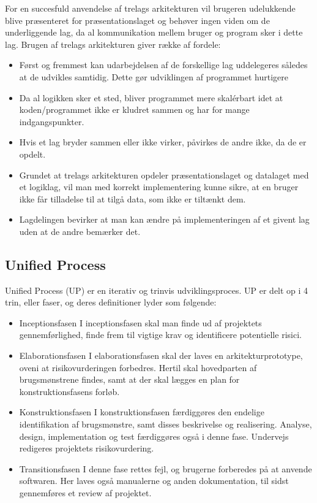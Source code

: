 For en succesfuld anvendelse af trelags arkitekturen vil brugeren udelukkende
blive præsenteret for præsentationslaget og behøver ingen viden om de
underliggende lag, da al kommunikation mellem bruger og program sker i dette
lag. Brugen af trelags arkitekturen giver række af fordele: 
\begin{itemize}
    \item Først og fremmest kan udarbejdelsen af de forskellige lag uddelegeres
        således at de udvikles samtidig. Dette gør udviklingen af programmet
        hurtigere 
    \item Da al logikken sker et sted, bliver programmet mere
        skalérbart idet at koden/programmet ikke er kludret sammen og har for
        mange indgangspunkter.  
    \item Hvis et lag bryder sammen eller ikke
        virker, påvirkes de andre ikke, da de er opdelt.
    \item Grundet at trelags arkitekturen opdeler præsentationslaget og
        datalaget med et logiklag, vil man med korrekt implementering kunne
        sikre, at en bruger ikke får tilladelse til at tilgå data, som ikke er
        tiltænkt dem. 
    \item Lagdelingen bevirker at man kan ændre på implementeringen af et givent
        lag uden at de andre bemærker det.
\end{itemize}

\subsection{Unified Process} \label{section: Unified Process}
Unified Process (UP) er en iterativ og trinvis udviklingsproces. UP er delt op i 4 trin, eller faser, og deres definitioner lyder som følgende:
\begin{itemize}
    \item Inceptionsfasen
        \subitem I inceptionsfasen skal man finde ud af projektets gennemførlighed, finde frem til vigtige krav og identificere potentielle risici.
    \item Elaborationsfasen
        \subitem I elaborationsfasen skal der laves en arkitekturprototype, oveni at risikovurderingen forbedres. Hertil skal hovedparten af brugsmønstrene findes, samt at der skal lægges en plan for konstruktionsfasens forløb.
    \item Konstruktionsfasen
        \subitem I konstruktionsfasen færdiggøres den endelige identifikation af brugsmønstre, samt disses beskrivelse og realisering. Analyse, design, implementation og test færdiggøres også i denne fase. Undervejs redigeres projektets risikovurdering.
    \item Transitionsfasen
        \subitem I denne fase rettes fejl, og brugerne forberedes på at anvende softwaren. Her laves også manualerne og anden dokumentation, til sidst gennemføres et review af projektet. 
\end{itemize}
 
